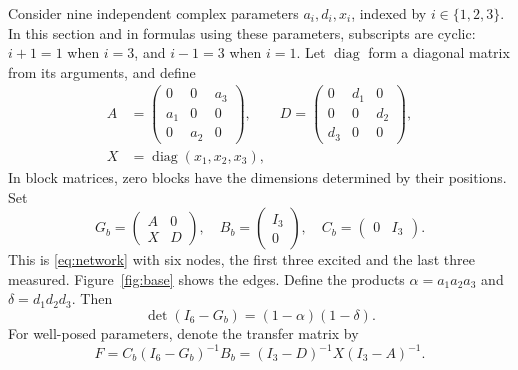 \documentclass[letterpaper,10pt,conference]{ieeeconf}
\newcommand{\diag}{\operatorname{diag}}
\begin{document}
Consider nine independent complex parameters \(a_i,d_i,x_i\), indexed by
\(i\in\{1,2,3\}\). In this section and in formulas using these parameters,
subscripts are cyclic: \(i+1=1\) when \(i=3\), and \(i-1=3\) when \(i=1\).
Let \(\diag\) form a diagonal matrix from its arguments, and define
\begin{equation}\label{eq:blocks}
\begin{split}
 A&=\begin{pmatrix}0&0&a_3\\a_1&0&0\\0&a_2&0\end{pmatrix},\qquad
 D=\begin{pmatrix}0&d_1&0\\0&0&d_2\\d_3&0&0\end{pmatrix},\\
 X&=\diag(x_1,x_2,x_3),
\end{split}
\end{equation}
In block matrices, zero blocks have the dimensions determined by their
positions. Set
\begin{equation}\label{eq:base}
 G_b=\begin{pmatrix}A&0\\X&D\end{pmatrix},\quad
 B_b=\begin{pmatrix}I_3\\0\end{pmatrix},\quad
 C_b=\begin{pmatrix}0&I_3\end{pmatrix}.
\end{equation}
This is \eqref{eq:network} with six nodes, the first three excited and
the last three measured. Figure~\ref{fig:base} shows the edges.
Define the products \(\alpha=a_1a_2a_3\) and
\(\delta=d_1d_2d_3\). Then
\[
 \det(I_6-G_b)=(1-\alpha)(1-\delta).
\]
For well-posed parameters, denote the transfer matrix by
\begin{equation}\label{eq:F}
 F=C_b(I_6-G_b)^{-1}B_b=(I_3-D)^{-1}X(I_3-A)^{-1}.
\end{equation}
\end{document}
